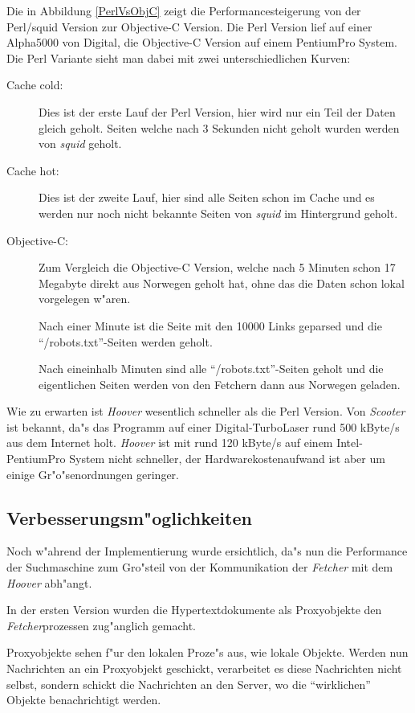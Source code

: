 Die in Abbildung \ref{PerlVsObjC} zeigt die Performancesteigerung von der Perl/squid Version zur Objective-C Version. Die Perl Version lief auf einer Alpha5000 von Digital, die Objective-C Version auf einem PentiumPro System.
Die Perl Variante sieht man dabei mit zwei unterschiedlichen Kurven:
\begin{description}
	\item[Cache cold:]	Dies ist der erste Lauf der Perl Version, hier wird nur ein Teil der Daten gleich geholt. Seiten welche nach 3 Sekunden nicht geholt wurden werden von {\em squid} geholt.
	\item[Cache hot:]	Dies ist der zweite Lauf, hier sind alle Seiten schon im Cache und es werden nur noch nicht bekannte Seiten von {\em squid} im Hintergrund geholt.
	\item[Objective-C:]	Zum Vergleich die Objective-C Version, welche nach 5 Minuten schon 17 Megabyte direkt aus Norwegen geholt hat, ohne das die Daten schon lokal vorgelegen w"aren.
	
	Nach einer Minute ist die Seite mit den 10000 Links geparsed und die "`/robots.txt"'-Seiten werden geholt.
	
	Nach eineinhalb Minuten sind alle "`/robots.txt"'-Seiten geholt und die eigentlichen Seiten werden von den Fetchern dann aus Norwegen geladen.  
\end{description}

Wie zu erwarten ist {\em Hoover} wesentlich schneller als die Perl Version. Von {\em Scooter} ist bekannt, da"s das Programm auf einer Digital-TurboLaser rund 500 kByte/s aus dem Internet holt. {\em Hoover} ist mit rund 120 kByte/s auf einem Intel-PentiumPro System nicht schneller, der Hardwarekostenaufwand ist aber um einige Gr"o"senordnungen geringer.


\subsection{Verbesserungsm"oglichkeiten}

Noch w"ahrend der Implementierung wurde ersichtlich, da"s nun die Performance der Suchmaschine zum Gro"steil von der Kommunikation der {\em Fetcher} mit dem {\em Hoover} abh"angt.

In der ersten Version wurden die Hypertextdokumente als Proxyobjekte den {\em Fetcher\/}prozessen zug"anglich gemacht.

Proxyobjekte sehen f"ur den lokalen Proze"s aus, wie lokale Objekte. Werden nun Nachrichten an ein Proxyobjekt geschickt, verarbeitet es diese Nachrichten nicht selbst, sondern schickt die Nachrichten an den Server, wo die "`wirklichen"' Objekte benachrichtigt werden.

